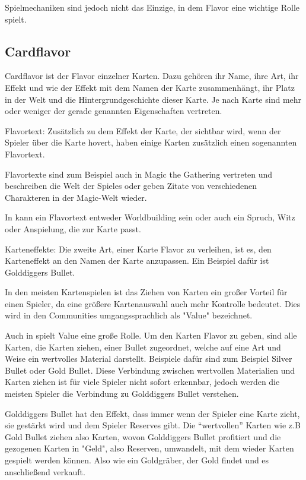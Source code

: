 Spielmechaniken sind jedoch nicht das Einzige, in dem Flavor eine wichtige Rolle spielt.

\subsection{Cardflavor}\label{subsec:cardflavor}

Cardflavor ist der Flavor einzelner Karten.
Dazu gehören ihr Name, ihre Art, ihr Effekt und wie der Effekt mit dem Namen der Karte zusammenhängt,
ihr Platz in der Welt und die Hintergrundgeschichte dieser Karte. Je nach Karte sind mehr oder weniger der gerade genannten
Eigenschaften vertreten.


Flavortext:
Zusätzlich zu dem Effekt der Karte, der sichtbar wird, wenn der Spieler über die Karte hovert, haben einige Karten zusätzlich einen sogenannten Flavortext.


Flavortexte sind zum Beispiel auch in Magic the Gathering vertreten und beschreiben die Welt der Spieles oder geben
Zitate von verschiedenen Charakteren in der Magic-Welt wieder. %


In \FF kann ein Flavortext entweder Worldbuilding sein oder auch ein Spruch, Witz oder Anspielung, die zur Karte passt.


Karteneffekte:
Die zweite Art, einer Karte Flavor zu verleihen, ist es, den Karteneffekt an den Namen der Karte anzupassen.
Ein Beispiel dafür ist Golddiggers Bullet.


In den meisten Kartenspielen ist das Ziehen von Karten ein großer Vorteil für einen Spieler, da eine größere Kartenauswahl
auch mehr Kontrolle bedeutet. Dies wird in den Communities umgangssprachlich als "Value" bezeichnet. 


Auch in \FF spielt Value eine große Rolle.
Um den Karten Flavor zu geben, sind alle Karten, die Karten ziehen, einer Bullet zugeordnet, welche auf eine Art und Weise ein wertvolles Material darstellt.
Beispiele dafür sind zum Beispiel Silver Bullet oder Gold Bullet. Diese Verbindung zwischen wertvollen
Materialien und Karten ziehen ist für viele Spieler nicht sofort erkennbar, jedoch werden die meisten Spieler die Verbindung zu Golddiggers Bullet verstehen.


Golddiggers Bullet hat den Effekt, dass immer wenn der Spieler eine Karte zieht, sie gestärkt wird und dem Spieler Reserves gibt. Die “wertvollen” Karten wie z.B Gold Bullet ziehen also Karten, wovon Golddiggers Bullet profitiert und die
gezogenen Karten in "Geld", also Reserven, umwandelt, mit dem wieder Karten gespielt werden können. Also wie ein Goldgräber, der Gold findet und es anschließend verkauft.

